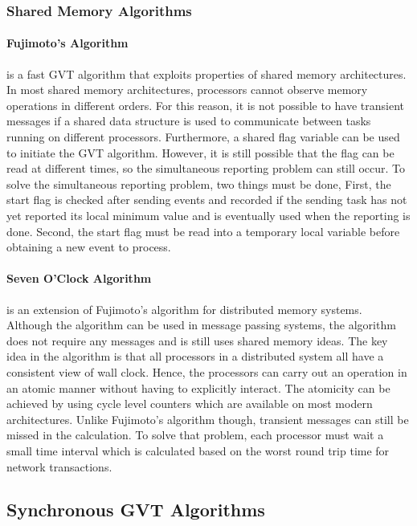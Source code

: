 \documentclass[11pt]{book}
\begin{document}
\subsubsection{Shared Memory Algorithms}

\paragraph{Fujimoto's Algorithm}\cite{fujimoto-94} is a fast GVT algorithm that exploits
properties of shared memory architectures.  In most shared memory architectures, processors
cannot observe memory operations in different orders.  For this reason, it is not possible
to have transient messages if a shared data structure is used to communicate between tasks
running on different processors.  Furthermore, a shared flag variable can be used to initiate
the GVT algorithm.  However, it is still possible that the flag can be read at different
times, so the simultaneous reporting problem can still occur.  To solve the simultaneous
reporting problem, two things must be done, First, the start flag is checked after sending
events and recorded if the sending task has not yet reported its local minimum value and
is eventually used when the reporting is done.  Second, the start flag must be read into a
temporary local variable before obtaining a new event to process.

\paragraph{Seven O'Clock Algorithm}\cite{bauer-05} is an extension of Fujimoto's algorithm
for distributed memory systems.  Although the algorithm can be used in message passing systems,
the algorithm does not require any messages and is still uses shared memory ideas.  The key idea
in the algorithm is that all processors in a distributed system all have a consistent view
of wall clock.  Hence, the processors can carry out an operation in an atomic manner without having
to explicitly interact.  The atomicity can be achieved by using cycle level counters which
are available on most modern architectures.  Unlike Fujimoto's algorithm though, transient
messages can still be missed in the calculation.  To solve that problem, each processor must
wait a small time interval which is calculated based on the worst round trip time for
network transactions.

\subsection{Synchronous GVT Algorithms}
\end{document}
